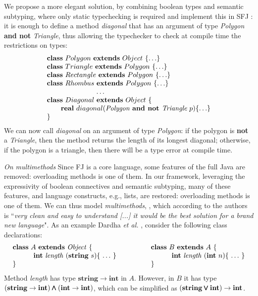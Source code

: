 \documentclass[runningheads]{llncs}
\begin{document}
\begin{example}[Polygons]
We propose a more elegant solution, by combining boolean types and semantic subtyping, where only static typechecking is required and implement this in SFJ \cite{UD20}: it is enough to define a method \emph{diagonal} that has an argument of type \emph{Polygon} \textbf{and not} \emph{Triangle}, thus allowing the typechecker to check at compile time the restrictions on types:
$$
\begin{array}{l}
\mathbf{class} \  Polygon \ \mathbf{extends }\  Object\ \{\ldots\}
\\
\mathbf{class} \  Triangle \ \mathbf{extends }\  Polygon\ \{\ldots\}
\\
\mathbf{class} \  Rectangle \ \mathbf{extends }\  Polygon\ \{\ldots\}
\\
\mathbf{class} \  Rhombus \ \mathbf{extends }\  Polygon\ \{\ldots\}
\\
\hspace{2.5cm} \ldots
\\
\mathbf{class} \  Diagonal \ \mathbf{extends }\  Object\ \{
	\\
	\qquad \mathbf{real}\ diagonal(\textit{Polygon} \textbf{ and not }  \textit{Triangle} \ p)\{\ldots\}
	\\
\}
\end{array}
$$
We can now call \emph{diagonal} on an argument of type \emph{Polygon}: if the polygon is \textbf{not} a \emph{Triangle}, then the method returns the length of its longest diagonal; otherwise, if the polygon is a triangle, then there will be a type error at compile time.
\end{example}
\emph{On multimethods}
Since FJ is a core language, some features of the full Java are removed: overloading methods is one of them.
In our framework, leveraging the expressivity of boolean connectives and semantic subtyping, many of these features, and language constructs, e.g., lists, are restored: overloading methods is one of them. We can thus model \emph{multimethods}, \cite{BC97}, which according to the authors is ``\emph{very clean and easy to understand [...] it would be the best solution for a brand new language}".
As an example Dardha \emph{et al.}  \cite{Dardha2013,Dardha2017}, consider the following class declarations:
$$
\begin{array}{ll}
\mathbf{class} \  A \ \mathbf{extends }\  \mathit{Object}\ \{
&
\qquad
\mathbf{class} \  B \ \mathbf{extends }\  A\ \{
\\
	\qquad\quad \mathbf{int}\ \mathit{length}\ (\mathbf{string}\ s)\{\ \ldots\ \}\qquad
&
	\qquad\qquad\quad \mathbf{int}\ \mathit{length}\ (\mathbf{int}\ n)\{\ \ldots\ \}
\\
\}
&
\qquad \}
\end{array}
$$
Method {\it length} has type $\mathbf{string} \rightarrow \mathbf{int}$ in $A$. However, in $B$ it has type $(\mathbf{string} \rightarrow \mathbf{int}) \pmb{\wedge} (\mathbf{int} \rightarrow \mathbf{int})$,
which can be simplified as $(\mathbf{string} \pmb{\vee} \mathbf{int}) \rightarrow \mathbf{int}$.
\end{document}
